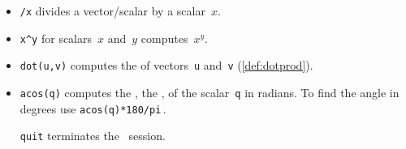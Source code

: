 \begin{itemize}
\itemlo The  \(\uv\cdot(\vv\times\wv)\) (\autoref{def:sctrpr}) is the volume of the parallelepiped with edges~\uv, \vv\ and~\wv.





\subsubsection{Use \script\ for vector computation}

\itemhi \verb|[ ... ]| forms vectors: use \(n\)~numbers separated by semi-colons for vectors in~\(\RR^n\) (or use newlines instead of the semi-colons).  

\itemhi \verb|=| assigns the result of the expression to the right of the~\verb|=| to the variable name on the left.

\itemme \verb|norm(v)| computes the \slash {} of the vector~\verb|v| (\autoref{def:veclen}).

\itemme \verb|+,-,*| is vector\slash scalar addition, subtraction, and multiplication.
Parentheses \verb|()| control the order of operations.

\item \verb|/x| divides a vector\slash scalar by a scalar~\(x\).

\item \verb|x^y| for scalars~\(x\) and~\(y\) computes~\(x^y\).

\item \verb|dot(u,v)| computes the  of vectors~\verb|u| and~\verb|v| (\autoref{def:dotprod}).

\item \verb|acos(q)| computes the , the , of the scalar~\verb|q| in radians.  
To find the angle in degrees use \verb|acos(q)*180/pi|\,.

\itemhi \verb|quit| terminates the \script\ session.





\end{itemize}


\makeanswers
